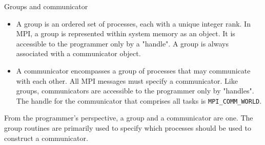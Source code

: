 \documentclass[aspectratio=43]{beamer}
\begin{document}
\begin{frame}[fragile]{Groups and communicator}
\begin{itemize}
\item A group is an ordered set of processes, each with a unique integer rank. In MPI, a group is represented within system memory as an object. It is accessible to the programmer only by a "handle". A group is always associated with a communicator object.
\item A communicator encompasses a group of processes that may communicate with each other. All MPI messages must specify a communicator. Like groups, communicators are accessible to the programmer only by "handles". The handle for the communicator that comprises all tasks is \verb+MPI_COMM_WORLD+.
\end{itemize}
From the programmer's perspective, a group and a communicator are
one. The group routines are primarily used to specify which
processes should be used to construct a communicator.
\end{frame}
\end{document}
